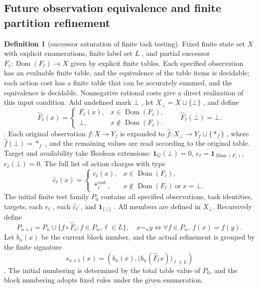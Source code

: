 \documentclass[12pt,a4paper,openany,notitlepage]{report}
\theoremstyle{plain}
\theoremstyle{definition}
\newtheorem{definition}[theorem]{Definition}
\theoremstyle{remark}
\def\mathcal#1{#1}\def\mathsf#1{#1}\def\mathbb#1{#1}%
\begin{document}
\begin{CJK*}
\section { Future observation equivalence and finite partition refinement }\label{exp:gov:refinement-section}


\begin{definition}
[successor saturation of finite task testing]\label{hgov:def:saturation}
Fixed finite state set $X$ with explicit enumerations, finite label set $L$ , and partial successor $F_\ell:\operatorname{Dom}(F_\ell)\to X$ given by explicit finite tables. Each specified observation has an evaluable finite table, and the equivalence of the table items is decidable; each action cost has a finite table that can be accurately summed, and the equivalence is decidable. Nonnegative rational costs give a direct realization of this input condition. Add undefined mark $\bot$ , let $X_\bot=X\sqcup\{\bot\}$ , and define \[
 \widehat F_\ell(x)=
 \begin{cases}
 F_\ell(x),&x\in\operatorname{Dom}(F_\ell),\\
 \bot,&x\notin\operatorname{Dom}(F_\ell).
 \end{cases}
 \qquad \widehat F_\ell(\bot)=\bot.
\] . Each original observation $f:X\to Y_f$ is expanded to $\widehat f:X_\bot\to Y_f\sqcup\{*_f\}$ , where $\widehat f(\bot)=*_f$ , and the remaining values are read according to the original table. Target and availability take Boolean extensions: $\mathbf1_G(\bot)=0$, $e_\ell=\mathbf1_{\operatorname{Dom}(F_\ell)}$, $e_\ell(\bot)=0$. The full list of action charges with type \[
 \widehat c_\ell(x)=
 \begin{cases}
 c_\ell(x),&x\in\operatorname{Dom}(F_\ell),\\
 *_\ell^{\mathrm{cost}},&x\notin\operatorname{Dom}(F_\ell)
 \ \text{or}\ x=\bot.
 \end{cases}
\] The initial finite test family $\mathcal P_0$ contains all specified observations, task identities, targets, each $e_\ell$ , each $\widehat c_\ell$ , and $\mathbf1_{\{\bot\}}$ . All members are defined in $X_\bot$. Recursively define \[
\mathcal P_{n+1}
=\mathcal P_n\cup\{f\circ\widehat F_\ell:
f\in\mathcal P_n,\ell\in L\},
\quad
x\sim_ny\iff\forall f\in\mathcal P_n,\ f(x)=f(y).
\] Let $b_n(x)$ be the current block number, and the actual refinement is grouped by the finite signature \[
 s_{n+1}(x)=
 \left(b_n(x),\bigl(b_n(\widehat F_\ell x)\bigr)_{\ell\in L}\right)
\]. The initial numbering is determined by the total table value of $\mathcal P_0$, and the block numbering adopts fixed rules under the given enumeration.\end{definition}



\end{CJK*}
\end{document}
